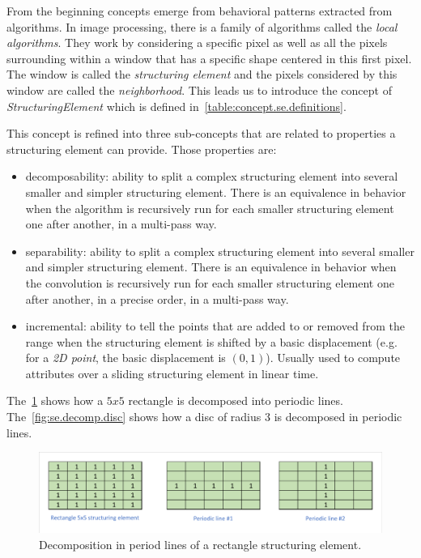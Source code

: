 From the beginning concepts emerge from behavioral patterns extracted from algorithms. In image processing, there is a
family of algorithms called the \emph{local algorithms}. They work by considering a specific pixel as well as all the
pixels surrounding within a window that has a specific shape centered in this first pixel. The window is called the
\emph{structuring element} and the pixels considered by this window are called the \emph{neighborhood}. This leads us to
introduce the concept of \emph{StructuringElement} which is defined in~\cref{table:concept.se.definitions}.

This concept is refined into three sub-concepts that are related to properties a structuring element can provide. Those
properties are:
\begin{itemize}
  \item decomposability: ability to split a complex structuring element into several smaller and simpler structuring
        element. There is an equivalence in behavior when the algorithm is recursively run for each smaller structuring
        element one after another, in a multi-pass way.
  \item separability: ability to split a complex structuring element into several smaller and simpler structuring
        element. There is an equivalence in behavior when the convolution is recursively run for each smaller
        structuring element one after another, in a precise order, in a multi-pass way.
  \item incremental: ability to tell the points that are added to or removed from the range when the structuring element
        is shifted by a basic displacement (e.g. for a \emph{2D point}, the basic displacement is \((0,1)\)). Usually
        used to compute attributes over a sliding structuring element in linear time.
\end{itemize}

The~\cref{fig:se.decomp.rect} shows how a $5x5$ rectangle is decomposed into periodic lines.
The~\cref{fig:se.decomp.disc} shows how a disc of radius 3 is decomposed in periodic lines.

\begin{figure}[htbp]
  \centering
  \includegraphics[width=.65\linewidth]{../figures/rect_se_decomp}
  \caption{Decomposition in period lines of a rectangle structuring element.}
  \label{fig:se.decomp.rect}
\end{figure}


